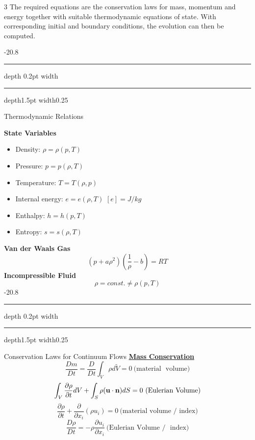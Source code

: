 \documentclass[8pt, landscape, fleqn]{scrartcl}
\makeatletter
\renewcommand{\section}{\@startsection{section}{1}{0mm}%
{-2\baselineskip}{0.8\baselineskip}%
{\hrule depth 0.2pt width\columnwidth\hrule depth1.5pt
width0.25\columnwidth\vspace*{1.2em}\Large\bfseries\rmfamily}}
\makeatother
\begin{document}
\begin{multicols*}{3}
The required equations are the conservation laws for mass, momentum and energy together with suitable thermodynamic equations of state. With corresponding initial and boundary conditions, the evolution can then be computed.

\section{Thermodynamic Relations}

\textbf{State Variables}
\begin{itemize}
    \item Density: $\rho = \rho(p,T)$
    \item Pressure: $p = p(\rho,T)$
    \item Temperature: $T = T(\rho, p)$
    \item Internal energy: $e = e(\rho, T)$ $[e] = J/kg$
    \item Enthalpy: $h = h(p,T)$
    \item Entropy: $s = s(\rho, T)$
\end{itemize}
\textbf{Van der Waals Gas}
\begin{equation*}
    (p+a\rho^2)\left(\frac{1}{\rho}-b\right) = RT
\end{equation*}
\textbf{Incompressible Fluid}
\begin{equation*}
    \rho = const. \neq \rho(p,T)
\end{equation*}
\section{Conservation Laws for Continuum Flows}
\underline{\textbf{Mass Conservation}} \\
\begin{equation*}
	\frac{Dm}{Dt} = \frac{D}{Dt}\int_{\tilde V} \rho d\tilde V = 0 ~\text{(material~ volume)}
\end{equation*}
\begin{equation*}
	\int_V \frac{\partial \rho}{\partial t} dV + \int_S \rho(\bold{u}\cdot \bold{n}) dS = 0~\text{(Eulerian~Volume)}
\end{equation*}
\begin{equation*}
	\frac{\partial \rho}{\partial t} + \frac{\partial}{\partial x_i}(\rho u_i) = 0~\text{(material~volume~/~index)}
\end{equation*}
\begin{equation*}
	\frac{D\rho}{Dt} = -\rho \frac{\partial u_i}{\partial x_i}~\text{(Eulerian~Volume / ~index)}
\end{equation*}


\end{multicols*}
\end{document}
